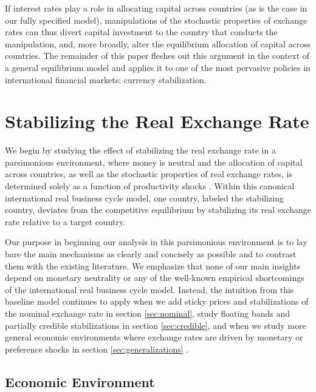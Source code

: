 \documentclass[12pt,letter]{article}
\theoremstyle{break} \theorembodyfont{\normalfont\itshape}
\theoremstyle{break}
\theoremstyle{break} \theorembodyfont{\normalfont\itshape}
\theoremstyle{break} \theorembodyfont{\normalfont\itshape}
\begin{document}
If interest rates play a role in allocating capital across countries
(as is the case in our fully specified model), manipulations of the
stochastic properties of exchange rates can thus divert capital
investment to the country that conducts the manipulation, and, more
broadly, alter the equilibrium allocation of capital across countries.
The remainder of this paper fleshes out this argument in the context
of a general equilibrium model and applies it to one of the most
pervasive policies in international financial markets: currency
stabilization.







\section{Stabilizing the Real Exchange
  Rate\label{sec_Setup}\label{sec:real}}

We begin by studying the effect of stabilizing the real exchange rate
in a parsimonious environment, where money is neutral and the
allocation of capital across countries, as well as the stochastic
properties of real exchange rates, is determined solely as a function
of productivity shocks \citep{BackusSmith1993}. Within this canonical
international real business cycle model, one country, labeled the
stabilizing country, deviates from the competitive equilibrium by
stabilizing its real exchange rate relative to a target country.

Our purpose in beginning our analysis in this parsimonious environment
is to lay bare the main mechanisms as clearly and concisely as
possible and to contrast them with the existing literature. We
emphasize that none of our main insights depend on monetary neutrality
or any of the well-known empirical shortcomings of the international
real business cycle model. Instead, the intuition from this baseline
model continues to apply when we add sticky prices and stabilizations
of the nominal exchange rate in section \ref{sec:nominal}, study
floating bands and partially credible stabilizations in section
\ref{sec:credible}, and when we study more general economic
environments where exchange rates are driven by monetary or preference
shocks in section \ref{sec:generalizations} .


\subsection{Economic Environment\label{sec:environment}}
\end{document}
